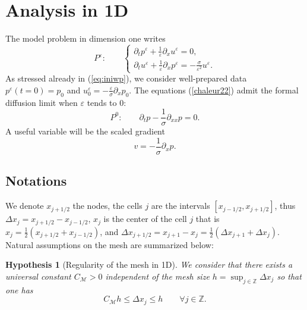 \documentclass[a4paper,french,english,10pt]{article}
\newcommand\eps{\varepsilon}
\newcommand{\dx}{\partial_x}
\newcommand{\dt}{\partial_t}
\newtheorem{hyp}[theorem]{Hypothesis}
\begin{document}
\section{Analysis in 1D} \label{sec:2}



The model problem in dimension one writes
\begin{equation}\label{chaleur22}
P^\varepsilon: \qquad
 \left \{
\begin{array}{lll}
\partial_t p^{\eps} + \frac{1}{\eps}\partial_x u^{\eps} =0, \\
\partial_t u^{\eps} + \frac{1}{\eps}\partial_x p^{\eps} =
-\frac{\sigma}{\eps^2}u^{\eps}.
\end{array}
\right.
\end{equation}
As stressed already in (\ref{eq:iniwp}), we consider well-prepared data
$
p^\varepsilon(t=0)=p_0 $  and  $u_0^\varepsilon=-\frac\varepsilon \sigma \partial_{x}p_0$.
The equations (\ref{chaleur22}) 
admit the formal diffusion limit when $\eps$ tends to $0$:
\begin{equation}\label{difffff}
P^0: \qquad 
\dt p -\frac{1}{\sigma}\partial_{xx}p=0.
\end{equation}
A useful variable will be  the scaled gradient  
\begin{equation} \label{eq:diff-v}
v=-\frac{1}{\sigma}\dx p.
\end{equation}

\subsection{Notations}
We denote $x_{j+1/2}$ the nodes, the cells $j$ are the intervals $[x_{j-1/2},x_{j+1/2}]$, thus $\Delta x_j=x_{j+1/2}-x_{j-1/2}$, $x_j$ is the center of the cell $j$ that is $x_j =\frac12(x_{j+1/2}+x_{j-1/2})$, and $\Delta x_{j+1/2}=x_{j+1}-x_j=\frac12(\Delta x_{j+1}+\Delta x_{j})$. Natural assumptions on the mesh are summarized below:

\begin{hyp}[Regularity of the mesh in 1D] \label{geometrie1d}
 We consider that there exists 
a universal constant $C_{\mathcal{M}}>0$ independent of the mesh size
$h=\sup_{j\in \mathbb Z} \Delta x_j $
so that one has 
$$
C_{\mathcal{M}} h \leq \Delta x_j \leq h \qquad \forall j \in \mathbb{Z}.
$$
\end{hyp}
\end{document}
